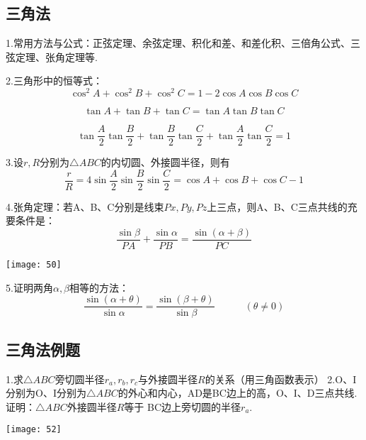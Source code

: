 \subsection{三角法}
1.常用方法与公式：正弦定理、余弦定理、积化和差、和差化积、三倍角公式、三弦定理、张角定理等.

2.三角形中的恒等式：
\begin{equation*}
    \cos^2 A+\cos^2 B+\cos^2 C=1-2\cos A \cos B \cos C 
\end{equation*}

\begin{equation*}
    \tan A+\tan B+\tan C=\tan A \tan B \tan C
\end{equation*}

\begin{equation*}
    \tan{\frac{A}{2}} \tan{\frac{B}{2}}+\tan{\frac{B}{2}} \tan{\frac{C}{2}}+\tan{\frac{A}{2}} \tan{\frac{C}{2}}=1
\end{equation*}

3.设$r,R$分别为$\bigtriangleup ABC$的内切圆、外接圆半径，则有
\begin{equation*}
    \frac{r}{R}=4\sin{\frac{A}{2}} \sin{\frac{B}{2}} \sin{\frac{C}{2}}=\cos A + \cos B +\cos C-1
\end{equation*}

4.张角定理：若A、B、C分别是线束$Px,Py,Pz$上三点，则A、B、C三点共线的充要条件是：
$$\frac{\sin{\beta}}{PA} + \frac{\sin{\alpha}}{PB}=\frac{\sin{(\alpha+\beta)}}{PC}$$
\begin{center}
    \texttt{[image: 50]}
\end{center}

5.证明两角$\alpha,\beta$相等的方法：
\[
    \frac{\sin{(\alpha+\theta)}}{\sin{\alpha}}=\frac{\sin{(\beta+\theta)}}{\sin{\beta}}\quad \quad \quad (\theta \neq 0)
\]
\subsection{三角法例题}
1.求$\bigtriangleup ABC$旁切圆半径$r_a,r_b,r_c$与外接圆半径$R$的关系（用三角函数表示）
\newpage
2.O、I分别为O、I分别为$\bigtriangleup ABC$的外心和内心，AD是BC边上的高，O、I、D三点共线.证明：$\bigtriangleup ABC$外接圆半径$R$等于
BC边上旁切圆的半径$r_a$.
\begin{flushleft}
    \texttt{[image: 52]}
\end{flushleft}
~\\
~\\
~\\
~\\
~\\

